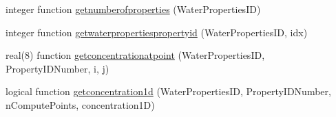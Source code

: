 \begin{DoxyCompactItemize}
\item 
integer function \mbox{\hyperlink{namespacemodulewaterproperties_a958863880a028313765dd3c1c2b598e2}{getnumberofproperties}} (Water\+Properties\+ID)
\item 
integer function \mbox{\hyperlink{namespacemodulewaterproperties_ab28fc6f29d4d9d76db5238daf0715caf}{getwaterpropertiespropertyid}} (Water\+Properties\+ID, idx)
\item 
real(8) function \mbox{\hyperlink{namespacemodulewaterproperties_ad43cb3a8e776adc92efab9346992a581}{getconcentrationatpoint}} (Water\+Properties\+ID, Property\+I\+D\+Number, i, j)
\item 
logical function \mbox{\hyperlink{namespacemodulewaterproperties_a07e476dc922e05a1476e0df171c1bd25}{getconcentration1d}} (Water\+Properties\+ID, Property\+I\+D\+Number, n\+Compute\+Points, concentration1D)
\end{DoxyCompactItemize}
